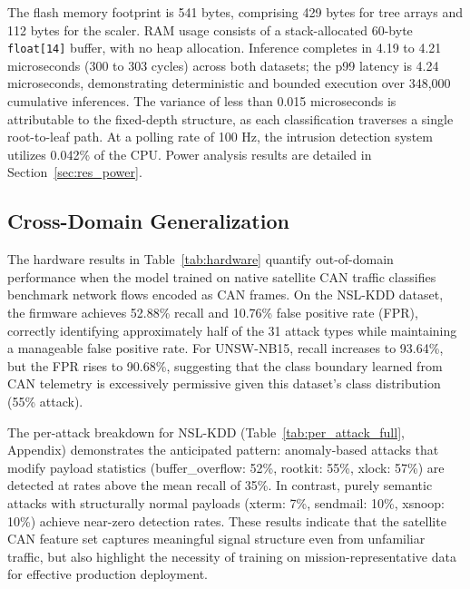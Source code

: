 The flash memory footprint is 541 bytes, comprising 429 bytes for tree arrays and 112 bytes for the scaler. RAM usage consists of a stack-allocated 60-byte \texttt{float[14]} buffer, with no heap allocation. Inference completes in 4.19 to 4.21 microseconds (300 to 303 cycles) across both datasets; the p99 latency is 4.24 microseconds, demonstrating deterministic and bounded execution over 348,000 cumulative inferences. The variance of less than 0.015 microseconds is attributable to the fixed-depth structure, as each classification traverses a single root-to-leaf path. At a polling rate of 100 Hz, the intrusion detection system utilizes 0.042\% of the CPU. Power analysis results are detailed in Section~\ref{sec:res_power}.

\subsection{Cross-Domain Generalization}
\label{sec:res_crossdomain}

The hardware results in Table~\ref{tab:hardware} quantify out-of-domain performance when the model trained on native satellite CAN traffic classifies benchmark network flows encoded as CAN frames. On the NSL-KDD dataset, the firmware achieves 52.88\% recall and 10.76\% false positive rate (FPR), correctly identifying approximately half of the 31 attack types while maintaining a manageable false positive rate. For UNSW-NB15, recall increases to 93.64\%, but the FPR rises to 90.68\%, suggesting that the class boundary learned from CAN telemetry is excessively permissive given this dataset's class distribution (55\% attack).

The per-attack breakdown for NSL-KDD (Table~\ref{tab:per_attack_full}, Appendix) demonstrates the anticipated pattern: anomaly-based attacks that modify payload statistics (buffer\_overflow: 52\%, rootkit: 55\%, xlock: 57\%) are detected at rates above the mean recall of 35\%. In contrast, purely semantic attacks with structurally normal payloads (xterm: 7\%, sendmail: 10\%, xsnoop: 10\%) achieve near-zero detection rates. These results indicate that the satellite CAN feature set captures meaningful signal structure even from unfamiliar traffic, but also highlight the necessity of training on mission-representative data for effective production deployment.


